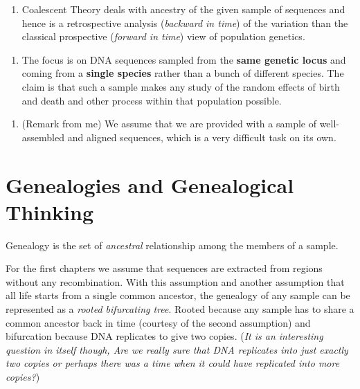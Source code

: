 \documentclass[
]{book}
\providecommand{\tightlist}{%
  \setlength{\itemsep}{0pt}\setlength{\parskip}{0pt}}
\theoremstyle{definition}
\theoremstyle{definition}
\theoremstyle{definition}
\theoremstyle{definition}
\theoremstyle{remark}
\begin{document}
\begin{enumerate}
\def\labelenumi{\arabic{enumi}.}
\setcounter{enumi}{2}
\tightlist
\item
  Coalescent Theory deals with ancestry of the given sample of sequences and hence is a retrospective analysis (\emph{backward in time}) of the variation than the classical prospective (\emph{forward in time}) view of population genetics.
\end{enumerate}

\begin{enumerate}
\def\labelenumi{\arabic{enumi}.}
\setcounter{enumi}{3}
\tightlist
\item
  The focus is on DNA sequences sampled from the \textbf{same genetic locus} and coming from a \textbf{single species} rather than a bunch of different species. The claim is that such a sample makes any study of the random effects of birth and death and other process within that population possible.
\end{enumerate}

\begin{enumerate}
\def\labelenumi{\arabic{enumi}.}
\setcounter{enumi}{4}
\tightlist
\item
  (Remark from me) We assume that we are provided with a sample of well-assembled and aligned sequences, which is a very difficult task on its own.
\end{enumerate}

\hypertarget{genealogies-and-genealogical-thinking}{%
\section{Genealogies and Genealogical Thinking}\label{genealogies-and-genealogical-thinking}}

Genealogy is the set of \emph{ancestral} relationship among the members of a sample.

For the first chapters we assume that sequences are extracted from regions without any recombination. With this assumption and another assumption that all life starts from a single common ancestor, the genealogy of any sample can be represented as a \emph{rooted bifurcating tree}. Rooted because any sample has to share a common ancestor back in time (courtesy of the second assumption) and bifurcation because DNA replicates to give two copies. (\emph{It is an interesting question in itself though, Are we really sure that DNA replicates into just exactly two copies or perhaps there was a time when it could have replicated into more copies?})
\end{document}
